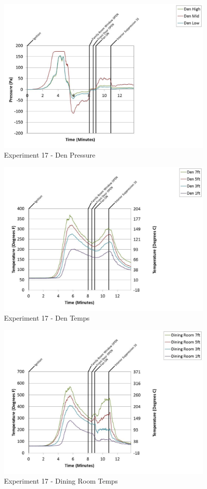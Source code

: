 \documentclass{article}
\begin{document}
\begin{appendices}
	\clearpage

	\begin{figure}[h!]
		\centering
		\includegraphics[height=3.05in]{0_Images/Results_Charts/Exp_17_Charts/DenPressure.pdf}
		\caption{Experiment 17 - Den Pressure}
	\end{figure}
 

	\begin{figure}[h!]
		\centering
		\includegraphics[height=3.05in]{0_Images/Results_Charts/Exp_17_Charts/DenTemps.pdf}
		\caption{Experiment 17 - Den Temps}
	\end{figure}
 
	\clearpage

	\begin{figure}[h!]
		\centering
		\includegraphics[height=3.05in]{0_Images/Results_Charts/Exp_17_Charts/DiningRoomTemps.pdf}
		\caption{Experiment 17 - Dining Room Temps}
	\end{figure}
 


\end{appendices}
\end{document}
